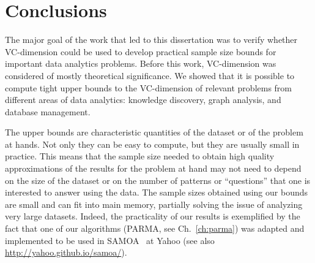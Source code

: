 \chapter{Conclusions}\label{ch:conclusions}

The major goal of the work that led to this dissertation was to verify whether
VC-dimension could be used to develop practical sample size bounds for important
data analytics problems. Before this work, VC-dimension was considered of mostly
theoretical significance. We showed that it is possible to compute tight upper
bounds to the VC-dimension of relevant problems from different areas of data
analytics: knowledge discovery, graph analysis, and database management. 

The upper bounds are characteristic quantities of the dataset or of the
problem at hands. Not only they can be easy to compute, but they are usually
small in practice. This means that the sample size needed to obtain high quality
approximations of the results for the problem at hand may not need to depend on
the size of the dataset or on the number of patterns or ``questions'' that one
is interested to answer using the data. The sample sizes obtained using our
bounds are small and can fit into main memory, partially solving the issue of
analyzing very large datasets. Indeed, the practicality of our results is
exemplified by the fact that one of our algorithms (PARMA, see
Ch.~\ref{ch:parma}) was adapted and implemented to be used in SAMOA~\citemissing
at Yahoo (see also \url{http://yahoo.github.io/samoa/}).

